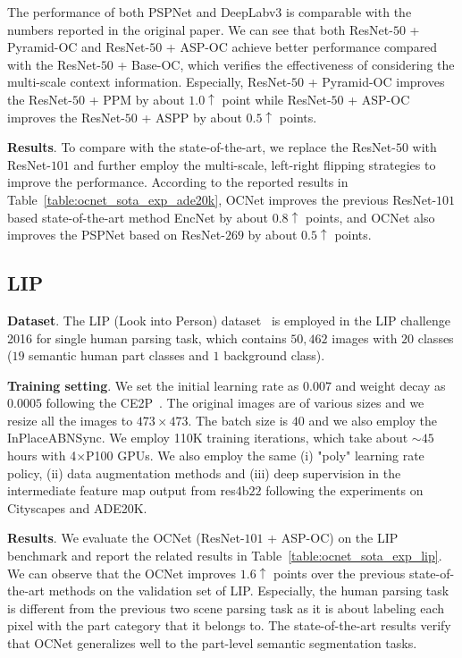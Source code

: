 \documentclass[10pt,twocolumn,letterpaper]{article}
\begin{document}
The performance of both PSPNet and DeepLabv3 is comparable with the numbers reported in the original paper.
We can see that both ResNet-$50$ + Pyramid-OC and ResNet-$50$ + ASP-OC achieve better performance compared with the ResNet-$50$ + Base-OC, which verifies the effectiveness of considering the multi-scale context information.
Especially, ResNet-$50$ + Pyramid-OC improves the ResNet-$50$ + PPM by about $1.0 \uparrow $ point while ResNet-$50$ + ASP-OC improves the ResNet-$50$ + ASPP by about $0.5 \uparrow $ points.

\vspace{0.1cm}
\noindent\textbf{Results}.
To compare with the state-of-the-art, we replace the ResNet-$50$ with ResNet-$101$ and further employ the multi-scale, left-right flipping strategies to improve the performance.
According to the reported results in Table~\ref{table:ocnet_sota_exp_ade20k}, OCNet improves the previous ResNet-$101$ based state-of-the-art method EncNet by about $0.8 \uparrow $ points,
and OCNet also improves the PSPNet based on ResNet-$269$ by about $0.5 \uparrow $ points.

\subsection{LIP}

\noindent\textbf{Dataset}.
The LIP (Look into Person) dataset~\cite{Gong_2017_CVPR} is employed in the LIP challenge 2016 for single human parsing task, which contains $50,462$ images with $20$ classes ($19$ semantic human part classes and $1$ background class).

\vspace{.1cm}
\noindent\textbf{Training setting}.
We set the initial learning rate as $0.007$ and weight decay as $0.0005$ following the CE2P~\cite{liu2018devil}.
The original images are of various sizes and we resize all the images to $473\times473$.
The batch size is $40$ and we also employ the InPlaceABNSync.
We employ 110K training iterations, which take about $\sim45$ hours with 4$\times$P100 GPUs.
We also employ the same (i) "poly" learning rate policy, (ii) data augmentation methods and (iii) deep supervision in the intermediate feature map output from res$4$b$22$ following the experiments on
Cityscapes and ADE20K.

\vspace{0.1cm}
\noindent\textbf{Results}.
We evaluate the OCNet (ResNet-$101$ + ASP-OC) on the LIP benchmark and report
the related results in Table~\ref{table:ocnet_sota_exp_lip}. We can observe that the OCNet improves $1.6 \uparrow$ points over the previous state-of-the-art methods on the validation set of LIP.
Especially, the human parsing task is different from the previous two scene parsing task as it is about labeling each pixel with the part category that it belongs to.
The state-of-the-art results verify that OCNet generalizes well to the part-level semantic segmentation tasks.
\end{document}

